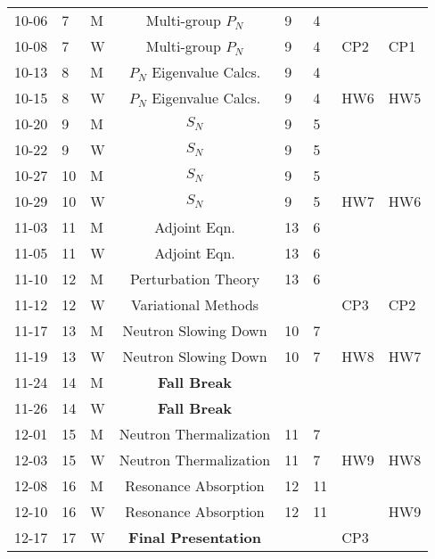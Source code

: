 \documentclass[11pt, a4paper]{article}
\begin{document}
\begin{table}[h]
\begin{center}
\begin{tabular}{lllcllll}
10-06 & 7 & M  & Multi-group $P_N$       & 9    & 4    &     & \\
10-08 & 7 & W  & Multi-group $P_N$       & 9    & 4    & CP2 & CP1\\
10-13 & 8 & M  & $P_N$ Eigenvalue Calcs. & 9    & 4    &     &   \\
10-15 & 8 & W  & $P_N$ Eigenvalue Calcs. & 9    & 4    & HW6 & HW5\\
10-20 & 9 & M  & $S_N$                   & 9    & 5    &     & \\
10-22 & 9 & W  & $S_N$                   & 9    & 5    &     & \\
10-27 & 10 & M & $S_N$                   & 9    & 5    &     &    \\
10-29 & 10 & W & $S_N$                   & 9    & 5    & HW7 & HW6 \\
11-03 & 11 & M & Adjoint Eqn.            & 13   & 6    &     & \\
11-05 & 11 & W & Adjoint Eqn.            & 13   & 6    &     & \\
11-10 & 12 & M & Perturbation Theory     & 13   & 6    &     & \\
11-12 & 12 & W & Variational Methods     &      &      & CP3 & CP2\\
11-17 & 13 & M & Neutron Slowing Down    & 10   & 7    &     & \\
11-19 & 13 & W & Neutron Slowing Down    & 10   & 7    & HW8 & HW7\\
11-24 & 14 & M & \textbf{Fall Break}     &      &      &     & \\
11-26 & 14 & W & \textbf{Fall Break}     &      &      &     &  \\
12-01 & 15 & M & Neutron Thermalization  & 11   & 7    &     & \\
12-03 & 15 & W & Neutron Thermalization  & 11   & 7    & HW9 & HW8\\
12-08 & 16 & M & Resonance Absorption    & 12   & 11   &     & \\
12-10 & 16 & W & Resonance Absorption    & 12   & 11   &     & HW9 \\
12-17 & 17 & W & \textbf{Final Presentation} &  &      & CP3 & \\
\end{tabular}
\end{center}
\end{table}
\end{document}
